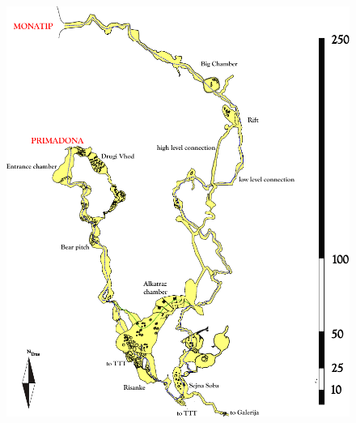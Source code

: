 \begin{figure}[t!]
\centering
\includegraphics[height=\textheight]{Prima-Mona-trip.pdf}
\label{prima mona trip}
\end{figure}
